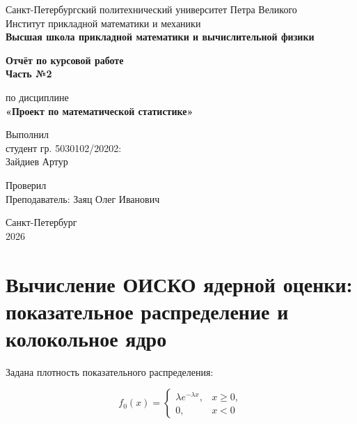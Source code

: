 \documentclass[12pt,a4paper]{article}
\begin{document}


\begin{titlepage}
  \begin{center}
    {Санкт-Петербургский политехнический университет Петра Великого\\
    Институт прикладной математики и механики\\[0.5em]
    \textbf{Высшая школа прикладной математики и вычислительной физики}}

    \vfill

    {\LARGE\bfseries Отчёт по курсовой работе\\ Часть №2\par}
    \vspace{1em}
    {\Large по дисциплине\\[0.3em]
    {\bfseries «Проект по математической статистике»}}

    \vfill

    \begin{flushright}
        Выполнил\\
        студент гр. 5030102/20202:\\
        Зайдиев Артур
    \end{flushright}

    \begin{flushright}
        Проверил\\
        Преподаватель: Заяц Олег Иванович
    \end{flushright}

    \vfill
    Санкт-Петербург\\
    2026
  \end{center}
\end{titlepage}

\setcounter{page}{2}
\newpage


\section*{Вычисление ОИСКО ядерной оценки: показательное распределение и колокольное ядро}

Задана плотность показательного распределения:

\[
f_0(x)=
\begin{cases}
\lambda e^{-\lambda x}, & x \ge 0,\\
0, & x<0
\end{cases}
\]
\end{document}
